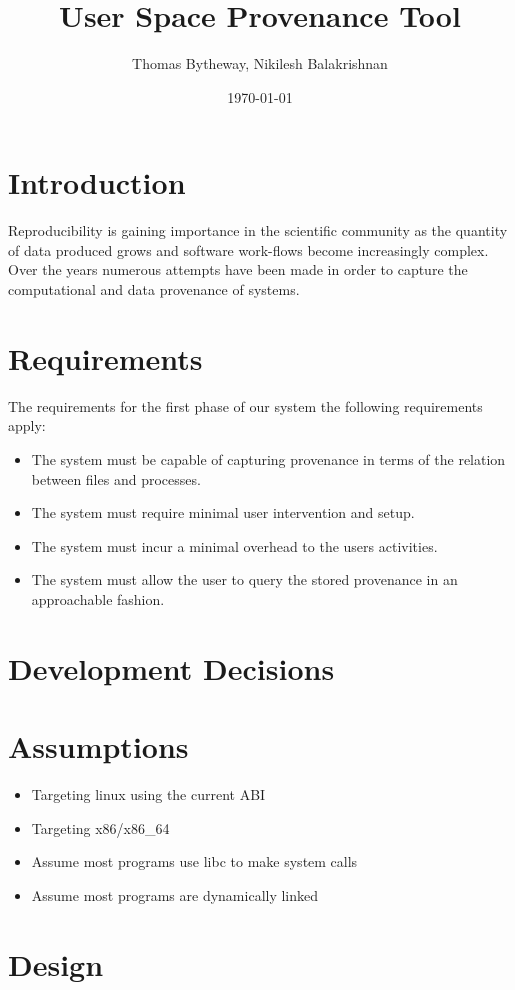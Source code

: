 \documentclass[10pt]{article}
\title{User Space Provenance Tool}
\date{\today}
\author{Thomas Bytheway, Nikilesh Balakrishnan}
\begin{document}
\maketitle
\section{Introduction}
Reproducibility is gaining importance in the scientific community as the quantity of data produced grows and software work-flows become increasingly complex. Over the years numerous attempts have been made in order to capture the computational and data provenance of systems.


\section{Requirements}
The requirements for the first phase of our system the following requirements apply:
\begin{itemize}
\item The system must be capable of capturing provenance in terms of the relation between files and processes.
\item The system must require minimal user intervention and setup.
\item The system must incur a minimal overhead to the users activities.
\item The system must allow the user to query the stored provenance in an approachable fashion.
\end{itemize}

\section{Development Decisions}



\section{Assumptions}
\begin{itemize}
\item Targeting linux using the current ABI
\item Targeting x86/x86\_64
\item Assume most programs use libc to make system calls
\item Assume most programs are dynamically linked
\end{itemize}

\section{Design}
\end{document}
